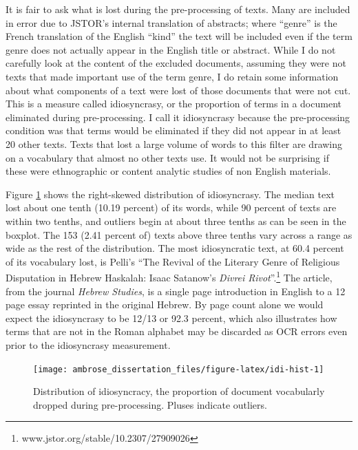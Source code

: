 \documentclass[]{book}
\let\rmarkdownfootnote\footnote%
\def\footnote{\protect\rmarkdownfootnote}
\theoremstyle{definition}
\theoremstyle{definition}
\theoremstyle{definition}
\theoremstyle{remark}
\begin{document}
It is fair to ask what is lost during the pre-processing of texts. Many
are included in error due to JSTOR's internal translation of abstracts;
where ``genre'' is the French translation of the English ``kind'' the
text will be included even if the term genre does not actually appear in
the English title or abstract. While I do not carefully look at the
content of the excluded documents, assuming they were not texts that
made important use of the term genre, I do retain some information about
what components of a text were lost of those documents that were not
cut. This is a measure called idiosyncrasy, or the proportion of terms
in a document eliminated during pre-processing. I call it idiosyncrasy
because the pre-processing condition was that terms would be eliminated
if they did not appear in at least 20 other texts. Texts that lost a
large volume of words to this filter are drawing on a vocabulary that
almost no other texts use. It would not be surprising if these were
ethnographic or content analytic studies of non English materials.

Figure \ref{fig:idi-hist} shows the right-skewed distribution of
idiosyncrasy. The median text lost about one tenth (10.19 percent) of
its words, while 90 percent of texts are within two tenths, and outliers
begin at about three tenths as can be seen in the boxplot. The 153 (2.41
percent of) texts above three tenths vary across a range as wide as the
rest of the distribution. The most idiosyncratic text, at 60.4 percent
of its vocabulary lost, is Pelli's ``The Revival of the Literary Genre
of Religious Disputation in Hebrew Haskalah: Isaac Satanow's
\emph{Divrei Rivot}''.\footnote{www.jstor.org/stable/10.2307/27909026}
The article, from the journal \emph{Hebrew Studies}, is a single page
introduction in English to a 12 page essay reprinted in the original
Hebrew. By page count alone we would expect the idiosyncrasy to be 12/13
or 92.3 percent, which also illustrates how terms that are not in the
Roman alphabet may be discarded as OCR errors even prior to the
idiosyncrasy measurement.

\begin{figure}

{\centering \texttt{[image: ambrose\_dissertation\_files/figure-latex/idi-hist-1]} 

}

\caption{Distribution of idiosyncracy, the proportion of document vocabularly dropped during pre-processing. Pluses indicate outliers.}\label{fig:idi-hist}
\end{figure}
\end{document}

